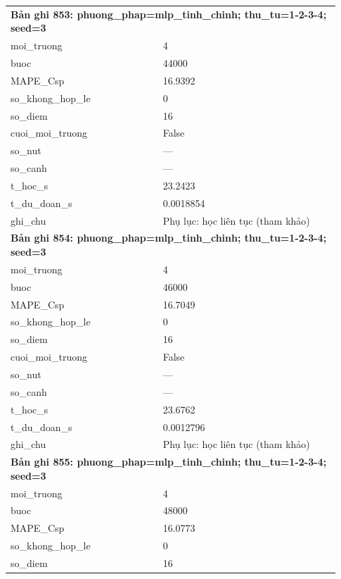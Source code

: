 \begin{longtable}{p{0.43\linewidth}p{0.50\linewidth}}
\midrule
\multicolumn{2}{p{0.95\linewidth}}{\textbf{Bản ghi 853: phuong\_phap=mlp\_tinh\_chinh; thu\_tu=1-2-3-4; seed=3}} \\
moi\_\allowbreak truong & 4 \\
buoc & 44000 \\
MAPE\_\allowbreak Csp & 16.9392 \\
so\_\allowbreak khong\_\allowbreak hop\_\allowbreak le & 0 \\
so\_\allowbreak diem & 16 \\
cuoi\_\allowbreak moi\_\allowbreak truong & False \\
so\_\allowbreak nut & — \\
so\_\allowbreak canh & — \\
t\_\allowbreak hoc\_\allowbreak s & 23.2423 \\
t\_\allowbreak du\_\allowbreak doan\_\allowbreak s & 0.0018854 \\
ghi\_\allowbreak chu & Phụ lục: học liên tục (tham khảo) \\
\midrule
\multicolumn{2}{p{0.95\linewidth}}{\textbf{Bản ghi 854: phuong\_phap=mlp\_tinh\_chinh; thu\_tu=1-2-3-4; seed=3}} \\
moi\_\allowbreak truong & 4 \\
buoc & 46000 \\
MAPE\_\allowbreak Csp & 16.7049 \\
so\_\allowbreak khong\_\allowbreak hop\_\allowbreak le & 0 \\
so\_\allowbreak diem & 16 \\
cuoi\_\allowbreak moi\_\allowbreak truong & False \\
so\_\allowbreak nut & — \\
so\_\allowbreak canh & — \\
t\_\allowbreak hoc\_\allowbreak s & 23.6762 \\
t\_\allowbreak du\_\allowbreak doan\_\allowbreak s & 0.0012796 \\
ghi\_\allowbreak chu & Phụ lục: học liên tục (tham khảo) \\
\midrule
\multicolumn{2}{p{0.95\linewidth}}{\textbf{Bản ghi 855: phuong\_phap=mlp\_tinh\_chinh; thu\_tu=1-2-3-4; seed=3}} \\
moi\_\allowbreak truong & 4 \\
buoc & 48000 \\
MAPE\_\allowbreak Csp & 16.0773 \\
so\_\allowbreak khong\_\allowbreak hop\_\allowbreak le & 0 \\
so\_\allowbreak diem & 16 \\

\end{longtable}
